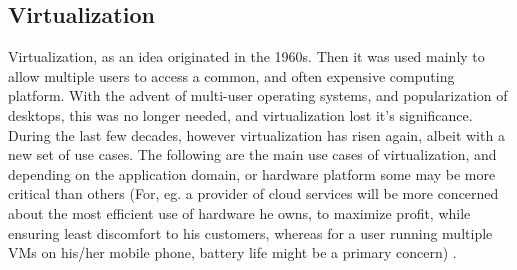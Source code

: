 \documentclass[a4paper,10pt]{article}
\begin{document}
\subsection{Virtualization}
Virtualization, as an idea originated in the 1960s. Then it was used mainly to allow multiple users to access a common, and often expensive computing platform.
With the advent of multi-user operating systems, and popularization of desktops, this was no longer needed, and virtualization lost it's significance.
During the last few decades, however virtualization has risen again, albeit with a new set of use cases.
The following are the main use cases of virtualization, and depending on the application domain, or hardware platform some may be more critical than others (For, eg. a provider of cloud services will
be more concerned about the most efficient use of hardware he owns, to maximize profit, while ensuring least discomfort to his customers, whereas for a user running multiple VMs on his/her mobile phone, battery life might
be a primary concern) .
\end{document}

